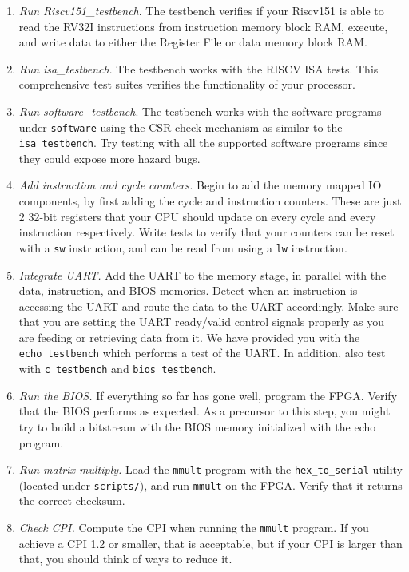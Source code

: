 \documentclass[11pt]{article}
\begin{document}
\begin{enumerate}
  \item \textit{Run Riscv151\_testbench}. The testbench verifies if your Riscv151 is able to read the RV32I instructions from instruction memory block RAM, execute, and write data to either the Register File or data memory block RAM.
  \item \textit{Run isa\_testbench}. The testbench works with the RISCV ISA tests. This comprehensive test suites verifies the functionality of your processor.
  \item \textit{Run software\_testbench}. The testbench works with the software programs under \verb|software| using the CSR check mechanism as similar to the \verb|isa_testbench|. Try testing with all the supported software programs since they could expose more hazard bugs.
  \item \textit{Add instruction and cycle counters.} Begin to add the memory mapped IO components, by first adding the cycle and instruction counters. These are just 2 32-bit registers that your CPU should update on every cycle and every instruction respectively. Write tests to verify that your counters can be reset with a \verb|sw| instruction, and can be read from using a \verb|lw| instruction.
  \item \textit{Integrate UART.} Add the UART to the memory stage, in parallel with the data, instruction, and BIOS memories. Detect when an instruction is accessing the UART and route the data to the UART accordingly. Make sure that you are setting the UART ready/valid control signals properly as you are feeding or retrieving data from it. We have provided you with the \verb|echo_testbench| which performs a test of the UART. In addition, also test with \verb|c_testbench| and \verb|bios_testbench|.
  \item \textit{Run the BIOS.} If everything so far has gone well, program the FPGA. Verify that the BIOS performs as expected. As a precursor to this step, you might try to build a bitstream with the BIOS memory initialized with the echo program.
  \item \textit{Run matrix multiply.} Load the \verb|mmult| program with the \verb|hex_to_serial| utility (located under \texttt{scripts/}), and run \verb|mmult| on the FPGA. Verify that it returns the correct checksum.
  \item \textit{Check CPI.} Compute the CPI when running the \verb|mmult| program. If you achieve a CPI 1.2 or smaller, that is acceptable, but if your CPI is larger than that, you should think of ways to reduce it.
\end{enumerate}
\end{document}

